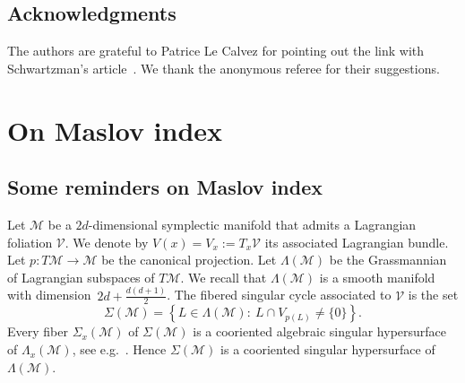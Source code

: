 \documentclass[AHL, Unicode, longabstracts, published]{cedram}
\newcommand*\M{\mathcal{M}}
\newcommand*\cv{\mathcal{V}}
\newcommand*\cal{\mathcal}
\begin{document}
\subsection*{Acknowledgments}
The authors are grateful to Patrice Le Calvez for pointing out the link with Schwartzman's article~\cite{Schwartzman1957}. We thank the anonymous referee for their suggestions.

\section{On Maslov index}\label{section def MI}

\subsection{Some reminders on Maslov index}\label{ssremindersMslov}

Let $\cal M$ be a $2d$-dimensional symplectic manifold that admits a Lagrangian foliation $\cal V$. We denote by $V(x)=V_x:=T_x\cal V$ its associated Lagrangian bundle. Let $p:T\M\rightarrow \cal M$ be the canonical projection. Let $\Lambda(\cal M)$ be the Grassmannian of Lagrangian subspaces of $T\cal M$. We recall that $\Lambda(\cal M)$ is a smooth manifold with dimension~$2d+\frac{d(d+1)}{2}$. The fibered singular cycle associated to $\cv$ is the set
\[
\Sigma(\cal M)=\left\{ L\in \Lambda(\cal M) :\ L\cap V_{p(L)}\not=\{ 0\}\right\}.
\]
Every fiber $\Sigma_x(\cal M)$ of $\Sigma(\cal M)$ is a cooriented algebraic singular hypersurface of $\Lambda_x(\cal M)$, see e.g.~\cite{McDuffSalamon2017,RobbinSalamon1993}. Hence $\Sigma(\cal M)$ is a cooriented singular hypersurface of $\Lambda(\cal M)$.
\end{document}
